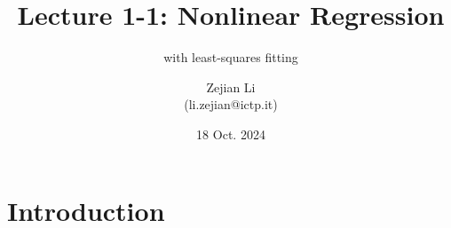 \documentclass[10pt,aspectratio=169,handout]{beamer}
\begin{document}
\author{Zejian Li \\(li.zejian@ictp.it)}
\title{Lecture 1-1: Nonlinear Regression}
\subtitle{with least-squares fitting}
\date{18 Oct. 2024}


\begin{frame}[plain]
	\maketitle
\end{frame}


\section{Introduction}
\end{document}
